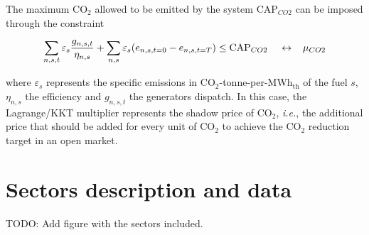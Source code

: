 \documentclass[3p]{elsarticle} %
\def\th{${}_{\textrm{th}}$}
\begin{document}
The maximum CO$_2$ allowed to be emitted by the system $\textrm{CAP}_{CO2}$ can be imposed through the constraint 

\begin{equation}
  \sum_{n,s,t}  \varepsilon_{s} \frac{ g_{n,s,t} }{\eta_{n,s}} + \sum_{n,s} \varepsilon_{s} (e_{n,s,t=0} - e_{n,s,t=T})  \leq  \textrm{CAP}_{CO2} \hspace{.4cm} \leftrightarrow \hspace{0.3cm} \mu_{CO2} \label{eq_co2cap}
\end{equation}

where $\varepsilon_{s}$ represents the specific emissions in CO$_2$-tonne-per-MWh\th{} of the fuel $s$, $\eta_{n,s}$ the efficiency and $g_{n,s,t}$ the generators dispatch. In this case, the Lagrange/KKT multiplier represents the shadow price of CO$_2$, \textit{i.e.}, the additional price that should be added for every unit of CO$_2$ to achieve the CO$_2$ reduction target in an open market. 

\section{Sectors description and data}

\textcolor[rgb]{1,0,0}{TODO: Add figure with the sectors included.}
\end{document}
